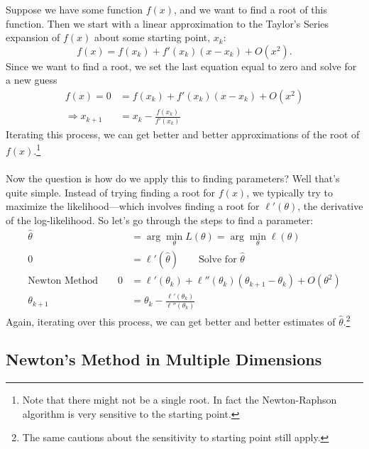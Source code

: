 \documentclass[a4paper,12pt]{scrartcl}
\begin{document}
Suppose we have some function $f(x)$, and we want to find a root
of this function. Then we start with a linear approximation
to the Taylor's Series expansion 
of $f(x)$ about some starting point, $x_k$:
   \[ f(x) = f(x_k) + f'(x_k)(x-x_k) + O(x^2).\]
Since we want to find a root, we set the last equation equal to
zero and solve for a new guess
\begin{align*}
   f(x) = 0 &= f(x_k) + f'(x_k)(x-x_k) + O(x^2) \\
   \Rightarrow x_{k+1} &= x_k - \frac{f(x_k)}{f'(x_k)} 
\end{align*}
Iterating this process, we can get better and better approximations
of the root of $f(x)$.\footnote{Note that there might not be a
single root. In fact the Newton-Raphson algorithm is very sensitive
to the starting point.}
\\
\\
Now the question is how do we apply this to finding parameters? Well
that's quite simple. Instead of trying finding a root for $f(x)$,
we typically try to maximize the likelihood---which involves finding
a root for $\ell'(\theta)$, the derivative of the log-likelihood.
So let's go through the steps to find a parameter:
\begin{align*}
   \hat{\theta} &= \arg \min_\theta L(\theta) = 
      \arg \min_\theta \ell(\theta) \\
      0 &= \ell'(\hat{\theta}) \qquad \text{Solve for $\hat{\theta}$}\\
      \text{Newton Method} \qquad 0 &= \ell'({\theta}_k) +
      \ell''({\theta}_k)({\theta}_{k+1} - {\theta}_k) 
	 + O({\theta}^2)\\
	 {\theta}_{k+1} &= {\theta}_k - 
	 \frac{\ell'({\theta}_k)}{\ell''({\theta}_k)}
\end{align*}
Again, iterating over this process, we can get better and better
estimates of $\hat{\theta}$.\footnote{The same cautions about 
the sensitivity to starting point still apply.}



\subsection{Newton's Method in Multiple Dimensions}
\end{document}
